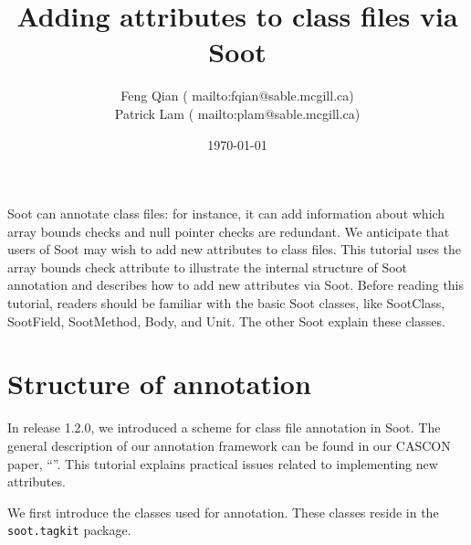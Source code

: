 \documentclass{article}
\begin{document}
\title{Adding attributes to class files via Soot}
\author{Feng Qian (
        {mailto:fqian@sable.mcgill.ca})\\
        Patrick Lam ( 
        {mailto:plam@sable.mcgill.ca})}
\date{\today}
\maketitle

Soot can annotate class files: for instance, it can add information
about which array bounds checks and null pointer checks are redundant.
We anticipate that users of Soot may wish to add new attributes to
class files.  This tutorial uses the array bounds check attribute to
illustrate the internal structure of Soot annotation and describes how
to add new attributes via Soot. Before reading this tutorial, readers
should be familiar with the basic Soot classes, like SootClass,
SootField, SootMethod, Body, and Unit. The other Soot
explain these classes.

\section{Structure of annotation}
In release 1.2.0, we introduced a scheme for class file annotation in
Soot.  The general description of our annotation framework can be
found in our CASCON paper, ``''.
This tutorial explains practical issues related to implementing new
attributes.

We first introduce the classes used for annotation.  These classes
reside in the {\tt soot.tagkit} package.
\end{document}

